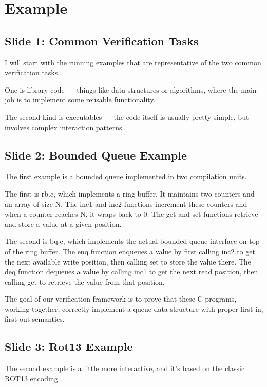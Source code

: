 \documentclass{article}
\begin{document}
\section{Example}

\subsection{Slide 1: Common Verification Tasks}

I will start with the running examples
that are representative of the two common verification tasks.

One is library code — things like data structures or algorithms, where the main
job is to implement some reusable functionality.

The second kind is executables — the code itself is usually pretty simple, but
involves complex interaction patterns.

\subsection{Slide 2: Bounded Queue Example}

The first example is a bounded queue implemented in two compilation units.

The first is rb.c, which implements a ring buffer. It maintains two counters and
an array of size N. The inc1 and inc2 functions increment these counters and
when a counter reaches N, it wraps back to 0. The get and set functions retrieve
and store a value at a given position.

The second is bq.c, which implements the actual bounded queue interface
on top of the ring buffer. The enq function enqueues a value by first calling
inc2 to get the next available write position, then calling set to store the
value there. The deq function dequeues a value by calling inc1 to get the next
read position, then calling get to retrieve the value from that position.

The goal of our verification framework is to prove that these C programs,
working together, correctly implement a queue data structure with proper
first-in, first-out semantics.

\subsection{Slide 3: Rot13 Example}

The second example is a little more interactive, and it's based on the classic
ROT13 encoding.
\end{document}
